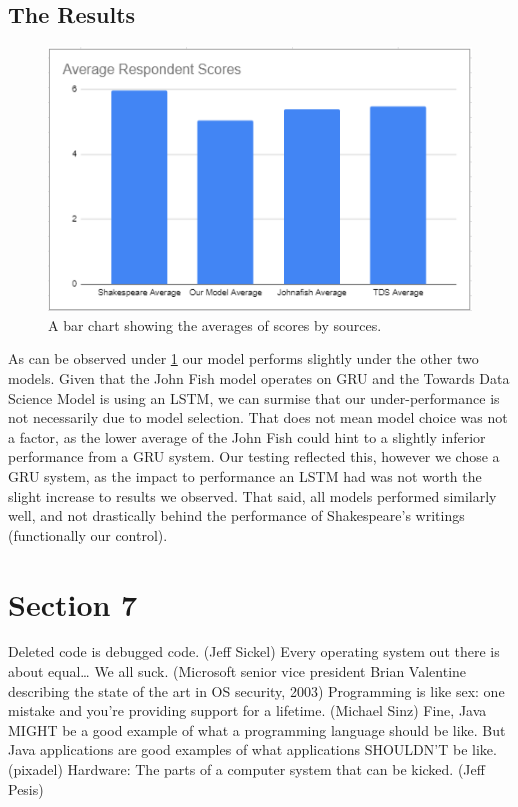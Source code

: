 \documentclass[11pt,a4paper]{article}
\begin{document}
\subsection{The Results}
\label{sec:results}

\begin{figure}
\centering
\includegraphics[width=.5\textwidth]{report/avgScores.png}
\caption{\label{fig:AverageScores}A bar chart showing the averages of scores by sources.}
\end{figure}

As can be observed under \ref{fig:AverageScores} our model performs slightly under the other two models. Given that the John Fish model operates on GRU and the Towards Data Science Model is using an LSTM, we can surmise that our under-performance is not necessarily due to model selection. That does not mean model choice was not a factor, as the lower average of the John Fish could hint to a slightly inferior performance from a GRU system. Our testing reflected this, however we chose a GRU system, as the impact to performance an LSTM had was not worth the slight increase to results we observed. 
That said, all models performed similarly well, and not drastically behind the performance of Shakespeare's writings (functionally our control).

\section{Section 7}
\label{sec:supplementary}

Deleted code is debugged code. (Jeff Sickel) Every operating system out there is about equal… We all suck. (Microsoft senior vice president Brian Valentine describing the state of the art in OS security, 2003) Programming is like sex: one mistake and you’re providing support for a lifetime. (Michael Sinz) Fine, Java MIGHT be a good example of what a programming language should be like. But Java applications are good examples of what applications SHOULDN’T be like. (pixadel) Hardware: The parts of a computer system that can be kicked. (Jeff Pesis)
\end{document}
